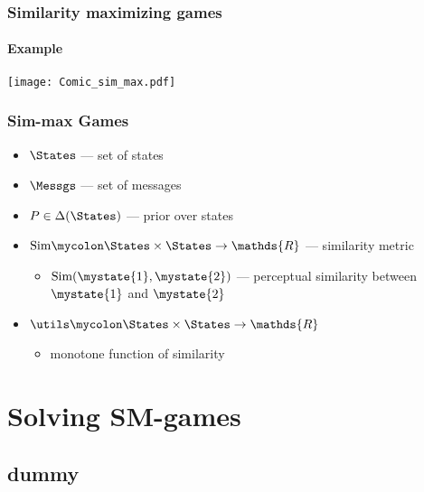 \documentclass[fleqn,9pt,xcolor=dvipsnames]{beamer}
\begin{document}
\begin{frame}
  \frametitle{Similarity maximizing games}
  \framesubtitle{Example}

    \begin{center}
      \vspace{-0.35cm}

      \texttt{[image: Comic\_sim\_max.pdf]}

     \end{center}

\end{frame}

\begin{frame}
  \frametitle{Sim-max Games}

    \begin{itemize}
    \item $\States$ --- set of states
    \item $\Messgs$ --- set of messages
    \item $P \in \Delta(\States)$ --- prior over states
    \item $\text{Sim} \mycolon \States \times \States \rightarrow \mathds{R}$ --- similarity metric
      \begin{itemize}
      \item $\text{Sim}(\mystate{1}, \mystate{2})$ --- perceptual similarity between
        $\mystate{1}$ and $\mystate{2}$ 
      \end{itemize}
    \item $\utils \mycolon \States \times \States \rightarrow \mathds{R}$
      \begin{itemize}
      \item monotone function of similarity 
      \end{itemize}

    \end{itemize}

\end{frame}

\section{Solving SM-games}
\subsection{dummy}
\end{document}
